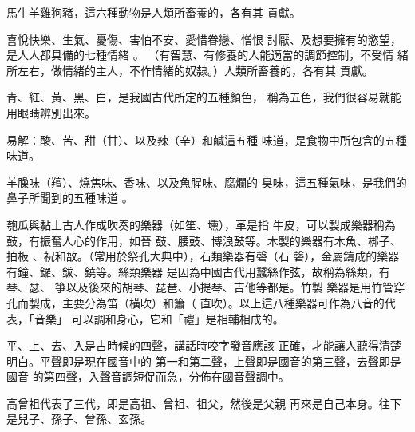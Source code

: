 \documentclass[avery5371,grid]{flashcards}
\begin{document}
{馬牛羊雞狗豬，這六種動物是人類所畜養的，各有其
貢獻。} %
{} %

{喜悅快樂、生氣、憂傷、害怕不安、愛惜眷戀、憎恨
討厭、及想要擁有的慾望，是人人都具備的七種情緒
。} %
{（有智慧、有修養的人能適當的調節控制，不受情
緒所左右，做情緒的主人，不作情緒的奴隸。）人類所畜養的，各有其
貢獻。} %





{青、紅、黃、黑、白，是我國古代所定的五種顏色，
稱為五色，我們很容易就能用眼睛辨別出來。} %
{} %

{易解：酸、苦、甜（甘）、以及辣（辛）和鹹這五種
味道，是食物中所包含的五種味道。} %
{} %

{羊臊味（羶）、燒焦味、香味、以及魚腥味、腐爛的
臭味，這五種氣味，是我們的鼻子所聞到的五種味道
。} %
{} %

{匏瓜與黏土古人作成吹奏的樂器（如笙、壎），革是指
牛皮，可以製成樂器稱為鼓，有振奮人心的作用，如晉
鼓、腰鼓、博浪鼓等。木製的樂器有木魚、梆子、拍板
、祝和敔。（常用於祭孔大典中），石類樂器有磬（石
磬），金屬鑄成的樂器有鐘、鑼、鈸、鐃等。絲類樂器
是因為中國古代用蠶絲作弦，故稱為絲類，有琴、瑟、
箏以及後來的胡琴、琵琶、小提琴、吉他等都是。竹製
樂器是用竹管穿孔而製成，主要分為笛（橫吹）和簫（
直吹）。以上這八種樂器可作為八音的代表，「音樂」
可以調和身心，它和「禮」是相輔相成的。} %
{} %

{平、上、去、入是古時候的四聲，講話時咬字發音應該
正確，才能讓人聽得清楚明白。平聲即是現在國音中的
第一和第二聲，上聲即是國音的第三聲，去聲即是國音
的第四聲，入聲音調短促而急，分佈在國音聲調中。} %
{} %

{高曾祖代表了三代，即是高祖、曾祖、祖父，然後是父親
再來是自己本身。往下是兒子、孫子、曾孫、玄孫。} %
{} %
\end{document}
